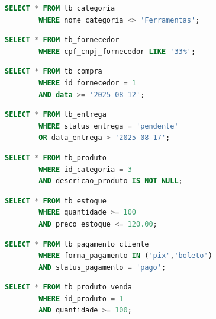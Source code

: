 \documentclass[
12pt,
a4paper,
semrecuonosumario,
sumario = abnt-6027-2012]{report}
\begin{document}
    \begin{lstlisting}[language=SQL,caption={SELECT -- Tabela \texttt{tb\_categoria}}]
        SELECT * FROM tb_categoria
        WHERE nome_categoria <> 'Ferramentas';
    \end{lstlisting}
    
    \begin{lstlisting}[language=SQL,caption={SELECT -- Tabela \texttt{tb\_fornecedor}}]
        SELECT * FROM tb_fornecedor
        WHERE cpf_cnpj_fornecedor LIKE '33%';
    \end{lstlisting}
    
    \begin{lstlisting}[language=SQL,caption={SELECT -- Tabela \texttt{tb\_compra}}]
        SELECT * FROM tb_compra
        WHERE id_fornecedor = 1
        AND data >= '2025-08-12';
    \end{lstlisting}
    
    \begin{lstlisting}[language=SQL,caption={SELECT -- Tabela \texttt{tb\_entrega}}]
        SELECT * FROM tb_entrega
        WHERE status_entrega = 'pendente'
        OR data_entrega > '2025-08-17';
    \end{lstlisting}
    
    \begin{lstlisting}[language=SQL,caption={SELECT -- Tabela \texttt{tb\_produto}}]
        SELECT * FROM tb_produto
        WHERE id_categoria = 3
        AND descricao_produto IS NOT NULL;
    \end{lstlisting}
    
    \begin{lstlisting}[language=SQL,caption={SELECT -- Tabela \texttt{tb\_estoque}}]
        SELECT * FROM tb_estoque
        WHERE quantidade >= 100
        AND preco_estoque <= 120.00;
    \end{lstlisting}
    
    \begin{lstlisting}[language=SQL,caption={SELECT -- Tabela \texttt{tb\_pagamento\_cliente}}]
        SELECT * FROM tb_pagamento_cliente
        WHERE forma_pagamento IN ('pix','boleto')
        AND status_pagamento = 'pago';
    \end{lstlisting}
    
    \begin{lstlisting}[language=SQL,caption={SELECT -- Tabela \texttt{tb\_produto\_venda}}]
        SELECT * FROM tb_produto_venda
        WHERE id_produto = 1
        AND quantidade >= 100;
    \end{lstlisting}
    
\end{document}
